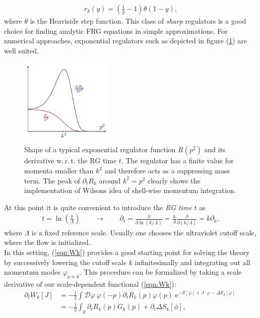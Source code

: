 \begin{align}
r_k(y) = \left(\frac{1}{y} - 1\right)\theta(1-y),	
\end{align}
where $\theta$ is the Heaviside step function. This class of \textit{sharp} regulators is a good choice for finding analytic FRG equations in simple approximations. For numerical approaches, exponential regulators such as depicted in figure (\ref{fig:exp_regulator}) are well suited.\\
\begin{figure}[t]
\centering
\includegraphics[width=0.4\textwidth]{figs/Plots/regulator_plot}
\caption[Shape of a typical exponential regulator function $R(p^2)$ and its derivative w.\,r.\,t. the RG time $t$.]{Shape of a typical exponential regulator function $R(p^2)$ and its derivative w.\,r.\,t. the RG time $t$. The regulator has a finite value for momenta smaller than $k^2$ and therefore acts as a suppressing mass term. The peak of $\partial_tR_k$ around $k^2=p^2$ clearly shows the implementation of Wilsons idea of shell-wise momentum integration.}	
\label{fig:exp_regulator}
\hrulefill
\end{figure}
At this point it is quite convenient to introduce the \textit{RG time} $t$ as
\begin{align}
	t = \ln\left(\frac{k}{\Lambda}\right) \qquad \longrightarrow\qquad \partial_t = \frac{\partial}{\partial\ln(k/\Lambda)} = \frac{k}{\Lambda}\frac{\partial}{\partial(k/\Lambda)} = k \partial_k,
\end{align}
where $\Lambda$ is a fixed reference scale. Usually one chooses the ultraviolet cutoff scale, where the flow is initialized.\\
In this setting, (\ref{eqn:Wk}) provides a good starting point for solving the theory by successively lowering the cutoff scale $k$ infinitesimally and integrating out all momentum modes $\varphi_{p\approx k}$. This procedure can be formalized by taking a scale derivative of our scale-dependent functional (\ref{eqn:Wk}):
\begin{equation}
\begin{aligned} \partial_{t} W_{k}[J] &=-\frac{1}{2} \int \mathcal{D} \varphi \ \varphi(-p) \partial_{t} R_{k}(p) \varphi(p) \operatorname{e}^{-\mathcal{S}[\varphi]+ J \cdot\varphi - \Delta \mathcal{S}_{k}[\varphi]} \\ &=-\frac{1}{2} \int_p \partial_{t} R_{k}(p) G_{k}(p)+\partial_{t} \Delta S_{k}[\phi], 
\label{eqn:dtW}
\end{aligned}
\end{equation}
